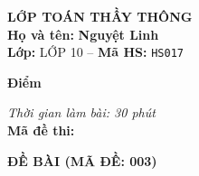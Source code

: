 \noindent
\begin{tcolorbox}[colback=white,colframe=black,arc=0mm,boxrule=0.8pt,top=4pt,bottom=4pt,left=6pt,right=6pt]
	\begin{minipage}[c]{0.44\textwidth}
		{\bfseries\large LỚP TOÁN THẦY THÔNG}\\[3pt]
		\textbf{Họ và tên:} \textbf{\large Nguyệt Linh}\\[3pt]
		\textbf{Lớp:} LỚP 10 \quad -- \quad \textbf{Mã HS:} \texttt{HS017}
	\end{minipage}
	\hfill
	\begin{minipage}[c]{0.22\textwidth}
		\begin{tcolorbox}[colback=white,colframe=black,arc=0mm,boxrule=0.6pt,height=1.8cm,halign=center,valign=top,top=2pt]
			{\bfseries\normalsize Điểm}
		\end{tcolorbox}
	\end{minipage}
	\hfill
	\begin{minipage}[c]{0.30\textwidth}
		\raggedleft
		\textit{Thời gian làm bài: 30 phút}\\[4pt]
		\textbf{Mã đề thi:} 
	\end{minipage}
\end{tcolorbox}
\vspace{0.25cm}

\noindent\textbf{\large ĐỀ BÀI (MÃ ĐỀ: 003)}
\vspace{0.1cm}

